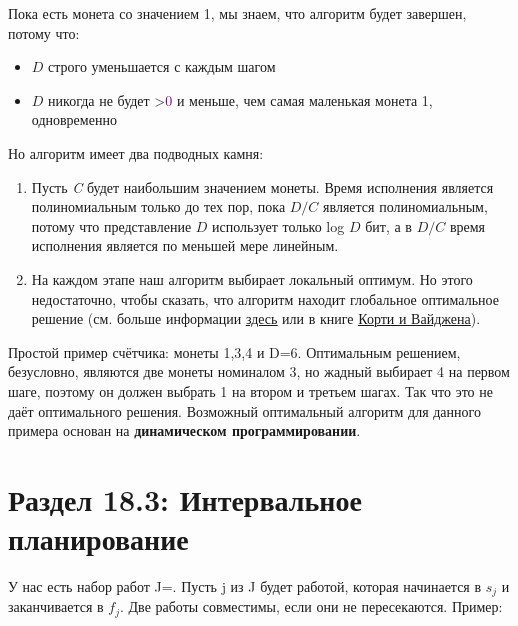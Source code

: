 \vspace{\baselineskip}

Пока есть монета со значением 1, мы знаем, что алгоритм будет завершен, потому что:
\begin{itemize}
    \item $D$ строго уменьшается с каждым шагом
    \item $D$ никогда не будет >\textcolor{Purple}{0} и меньше, чем самая маленькая монета 1, одновременно
\end{itemize}

Но алгоритм имеет два подводных камня:
\begin{enumerate}
    \item Пусть \textit{C} будет наибольшим значением монеты. Время исполнения является полиномиальным только до тех пор, пока $D/C$ является полиномиальным, потому что представление $D$ использует только { log} $D$ бит, а в $D/C$ время исполнения является по меньшей мере линейным.
    \item На каждом этапе наш алгоритм выбирает локальный оптимум. Но этого недостаточно, чтобы сказать, что алгоритм находит глобальное оптимальное решение (см. больше информации \href{https://vk.cc/atBY90}{\underline{здесь}} или в книге \href{http://www.or.uni-bonn.de/~vygen/co.html}{\underline{Корти и Вайджена}}).
\end{enumerate}

\vspace{\baselineskip}

Простой пример счётчика: монеты 1,3,4 и D=6. Оптимальным решением, безусловно, являются две монеты номиналом 3, но жадный выбирает 4 на первом шаге, поэтому он должен выбрать 1 на втором и третьем шагах. Так что это не даёт оптимального решения. Возможный оптимальный алгоритм для данного примера основан на \textbf{динамическом программировании}.

\section*{Раздел 18.3: Интервальное планирование}

У нас есть набор работ J={}. Пусть { j} из J будет работой, которая начинается в { $s_j$} и заканчивается в { $f_j$}. Две работы совместимы, если они не пересекаются. Пример:

\begin{center}
\end{center}

